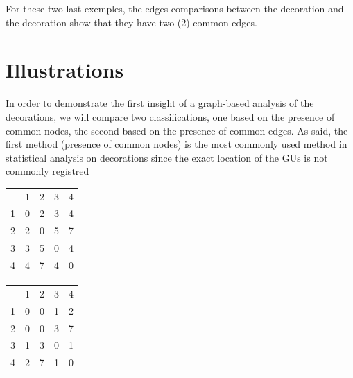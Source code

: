 \documentclass[article]{jss}\usepackage[]{graphicx}\usepackage[]{color}
\begin{document}
For these two last exemples, the edges comparisons between the decoration  and the decoration  show that they have two (2) common edges.


\section{Illustrations} \label{sec:illustrations}

In order to demonstrate the first insight of a graph-based analysis of the decorations, we will compare two classifications, one based on the presence of common nodes, the second based on the presence of common edges. As said, the first method (presence of common nodes) is the most commonly used method in statistical analysis on decorations since the exact location of the GUs is not commonly registred

\begin{table}[htb]
\begin{minipage}{.45\textwidth}
\centering
\begin{tabular}{rrrrr}
  & 1 & 2 & 3 & 4 \\ 
 1 & 0 & 2 & 3 & 4 \\ 
  2 & 2 & 0 & 5 & 7 \\ 
  3 & 3 & 5 & 0 & 4 \\ 
  4 & 4 & 7 & 4 & 0 \\ 
  \end{tabular}

\end{minipage}
\begin{minipage}{.45\textwidth}
\centering
\begin{tabular}{rrrrr}
  & 1 & 2 & 3 & 4 \\ 
 1 & 0 & 0 & 1 & 2 \\ 
  2 & 0 & 0 & 3 & 7 \\ 
  3 & 1 & 3 & 0 & 1 \\ 
  4 & 2 & 7 & 1 & 0 \\ 
  \end{tabular}

\end{minipage}
\end{table}
\end{document}
